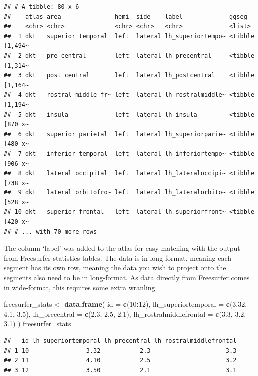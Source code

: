 \documentclass[fleqn,10pt]{wlpeerj} %
\newenvironment{Shaded}{\begin{snugshade}}{\end{snugshade}}
\newcommand{\DataTypeTok}[1]{\textcolor[rgb]{0.13,0.29,0.53}{#1}}
\newcommand{\DecValTok}[1]{\textcolor[rgb]{0.00,0.00,0.81}{#1}}
\newcommand{\FloatTok}[1]{\textcolor[rgb]{0.00,0.00,0.81}{#1}}
\newcommand{\KeywordTok}[1]{\textcolor[rgb]{0.13,0.29,0.53}{\textbf{#1}}}
\newcommand{\NormalTok}[1]{#1}
\newcommand{\OperatorTok}[1]{\textcolor[rgb]{0.81,0.36,0.00}{\textbf{#1}}}
\newcommand{\StringTok}[1]{\textcolor[rgb]{0.31,0.60,0.02}{#1}}
\begin{document}
\begin{verbatim}
## # A tibble: 80 x 6
##    atlas area               hemi  side    label             ggseg          
##    <chr> <chr>              <chr> <chr>   <chr>             <list>         
##  1 dkt   superior temporal  left  lateral lh_superiortempo~ <tibble [1,494~
##  2 dkt   pre central        left  lateral lh_precentral     <tibble [1,314~
##  3 dkt   post central       left  lateral lh_postcentral    <tibble [1,164~
##  4 dkt   rostral middle fr~ left  lateral lh_rostralmiddle~ <tibble [1,194~
##  5 dkt   insula             left  lateral lh_insula         <tibble [870 x~
##  6 dkt   superior parietal  left  lateral lh_superiorparie~ <tibble [480 x~
##  7 dkt   inferior temporal  left  lateral lh_inferiortempo~ <tibble [906 x~
##  8 dkt   lateral occipital  left  lateral lh_lateraloccipi~ <tibble [738 x~
##  9 dkt   lateral orbitofro~ left  lateral lh_lateralorbito~ <tibble [528 x~
## 10 dkt   superior frontal   left  lateral lh_superiorfront~ <tibble [420 x~
## # ... with 70 more rows
\end{verbatim}

\normalsize

The column `label' was added to the atlas for easy matching with the output from Freesurfer statistics tables.
The data is in long-format, meaning each segment has its own row, meaning the data you wish to project onto the segments also need to be in long-format.
As data directly from Freesurfer comes in wide-format, this requires some extra wranling.

\begin{Shaded}
\begin{Highlighting}[]
\NormalTok{freesurfer_stats <-}\StringTok{ }\KeywordTok{data.frame}\NormalTok{(}
  \DataTypeTok{id =} \KeywordTok{c}\NormalTok{(}\DecValTok{10}\OperatorTok{:}\DecValTok{12}\NormalTok{),}
  \DataTypeTok{lh_superiortemporal =} \KeywordTok{c}\NormalTok{(}\FloatTok{3.32}\NormalTok{, }\FloatTok{4.1}\NormalTok{, }\FloatTok{3.5}\NormalTok{),}
  \DataTypeTok{lh_precentral =} \KeywordTok{c}\NormalTok{(}\FloatTok{2.3}\NormalTok{, }\FloatTok{2.5}\NormalTok{, }\FloatTok{2.1}\NormalTok{),}
  \DataTypeTok{lh_rostralmiddlefrontal =} \KeywordTok{c}\NormalTok{(}\FloatTok{3.3}\NormalTok{, }\FloatTok{3.2}\NormalTok{, }\FloatTok{3.1}\NormalTok{)}
\NormalTok{  )}
\NormalTok{freesurfer_stats}
\end{Highlighting}
\end{Shaded}

\begin{verbatim}
##   id lh_superiortemporal lh_precentral lh_rostralmiddlefrontal
## 1 10                3.32           2.3                     3.3
## 2 11                4.10           2.5                     3.2
## 3 12                3.50           2.1                     3.1
\end{verbatim}
\end{document}
